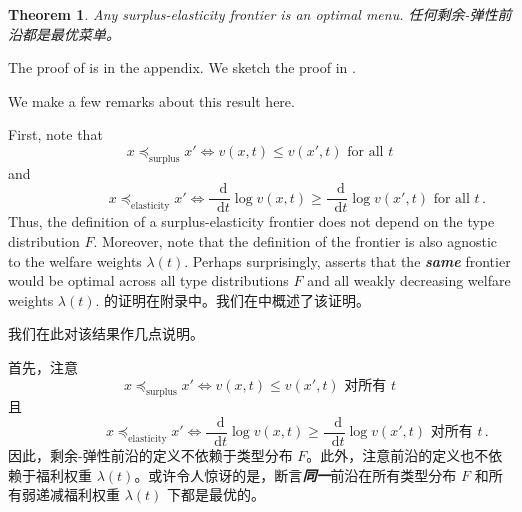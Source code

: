 \documentclass[12pt,letterpaper]{article}
\newenvironment{original}{\color{black}\noindent}{}
\newenvironment{translation}{\color{blue}\noindent}{}
\theoremstyle{plain}
\newtheorem{theorem}{Theorem}
\theoremstyle{definition}
\theoremstyle{remark}
\renewcommand{\1}{\mathds{1}}
\renewcommand*\d{\mathop{}\!\mathrm{d}}
\theoremstyle{definition}
\begin{document}
\begin{theorem}\label{thm:main}
\begin{original}
Any surplus-elasticity frontier is an optimal menu.
\end{original}
\begin{translation}
任何剩余-弹性前沿都是最优菜单。
\end{translation}
\end{theorem}

\begin{original}
The proof of  is in the appendix. We sketch the proof in .

We make a few remarks about this result here.

First, note that
\[x \preceq_{\text{surplus}} x'  \iff v(x, t) \leq v(x', t) \text{ for all $t$}\]
and
\[\qquad \qquad \quad \,\, x \preceq_{\text{elasticity}} x'  \iff \frac{\d}{\d t} \log v(x, t) \geq \frac{\d}{\d t} \log v(x', t) \text{ for all $t$}\,.\]
Thus, the definition of a surplus-elasticity frontier does not depend on the type distribution $F$. Moreover, note that the definition of the frontier is also agnostic to the welfare weights $\lambda(t)$. Perhaps surprisingly,   asserts that the \textit{\textbf{same}} frontier would be optimal across all type distributions $F$ and all weakly decreasing welfare weights $\lambda(t)$.
\end{original}
\begin{translation}
的证明在附录中。我们在中概述了该证明。

我们在此对该结果作几点说明。

首先，注意
\[x \preceq_{\text{surplus}} x'  \iff v(x, t) \leq v(x', t) \text{ 对所有 $t$}\]
且
\[\qquad \qquad \quad \,\, x \preceq_{\text{elasticity}} x'  \iff \frac{\d}{\d t} \log v(x, t) \geq \frac{\d}{\d t} \log v(x', t) \text{ 对所有 $t$}\,.\]
因此，剩余-弹性前沿的定义不依赖于类型分布 $F$。此外，注意前沿的定义也不依赖于福利权重 $\lambda(t)$。或许令人惊讶的是，断言\textit{\textbf{同一}}前沿在所有类型分布 $F$ 和所有弱递减福利权重 $\lambda(t)$ 下都是最优的。
\end{translation}
\end{document}
